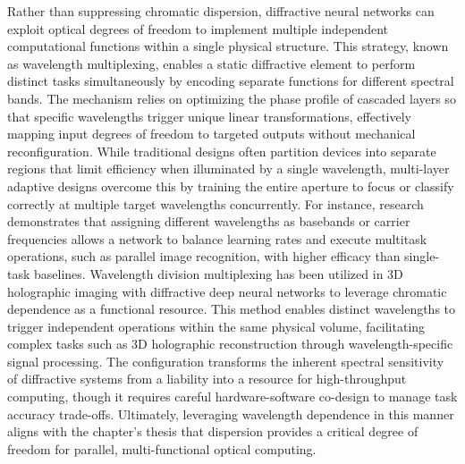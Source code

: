 Rather than suppressing chromatic dispersion, diffractive neural networks can exploit optical degrees of freedom to implement multiple independent computational functions within a single physical structure. This strategy, known as wavelength multiplexing, enables a static diffractive element to perform distinct tasks simultaneously by encoding separate functions for different spectral bands. The mechanism relies on optimizing the phase profile of cascaded layers so that specific wavelengths trigger unique linear transformations, effectively mapping input degrees of freedom to targeted outputs without mechanical reconfiguration. While traditional designs often partition devices into separate regions that limit efficiency when illuminated by a single wavelength, multi-layer adaptive designs overcome this by training the entire aperture to focus or classify correctly at multiple target wavelengths concurrently. For instance, research demonstrates that assigning different wavelengths as basebands or carrier frequencies allows a network to balance learning rates and execute multitask operations, such as parallel image recognition, with higher efficacy than single-task baselines. Wavelength division multiplexing has been utilized in 3D holographic imaging with diffractive deep neural networks to leverage chromatic dependence as a functional resource. This method enables distinct wavelengths to trigger independent operations within the same physical volume, facilitating complex tasks such as 3D holographic reconstruction through wavelength-specific signal processing. \citep{doi_10_1109_acp_ipoc63121_2024_10809872_a7935774} The configuration transforms the inherent spectral sensitivity of diffractive systems from a liability into a resource for high-throughput computing, though it requires careful hardware-software co-design to manage task accuracy trade-offs. Ultimately, leveraging wavelength dependence in this manner aligns with the chapter's thesis that dispersion provides a critical degree of freedom for parallel, multi-functional optical computing. \citep{doi_10_1038_s41377_022_00903_8_098356a7} \citep{doi_10_1364_prj_576203_ae347fba} \citep{doi_10_1364_ol_460186_da35c128} \citep{doi_10_1155_2020_9748380_13fcb0d2} \citep{s2_88f87b34acdb11cf20ad16d6fbdd5399e8617f8f_a548a720}


